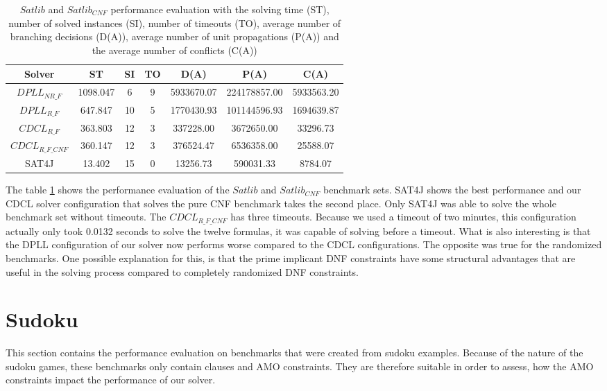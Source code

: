 \begin{table}[htb]
\centering
\caption[$Satlib$ and $Satlib_{CNF}$ performance evaluation]{$Satlib$ and $Satlib_{CNF}$ performance evaluation with the solving time (ST), number of solved instances (SI), number of timeouts (TO), average number of branching decisions (D(A)), average number of unit propagations (P(A)) and the average number of conflicts (C(A))}
\label{tab:satlibSat}
\begin{tabular}{|c|c|c|c|c|c|c|}
\hline
Solver & ST & SI & TO & D(A) & P(A) & C(A)\\ 
\hline
$DPLL_{NR\_F}$ & 1098.047 & 6 & 9 & 5933670.07 & 224178857.00 & 5933563.20 \\ 
\hline
$DPLL_{R\_F}$ & 647.847 & 10 & 5 & 1770430.93 & 101144596.93 & 1694639.87 \\ 
\hline
$CDCL_{R\_F}$ & 363.803 & 12 & 3 & 337228.00 & 3672650.00 & 33296.73 \\ 
\hline
$CDCL_{R\_F\_CNF}$ & 360.147 & 12 & 3 & 376524.47 & 6536358.00 & 25588.07 \\ 
\hline
SAT4J & 13.402 & 15 & 0 & 13256.73 & 590031.33 & 8784.07 \\ 
\hline
\end{tabular}
\end{table}

The table \ref{tab:satlibSat} shows the performance evaluation of the $Satlib$ and $Satlib_{CNF}$ benchmark sets. SAT4J shows the best performance and our CDCL solver configuration that solves the pure CNF benchmark takes the second place. Only SAT4J was able to solve the whole benchmark set without timeouts. The $CDCL_{R\_F\_CNF}$ has three timeouts. Because we used a timeout of two minutes, this configuration actually only took 0.0132 seconds to solve the twelve formulas, it was capable of solving before a timeout. What is also interesting is that the DPLL configuration of our solver now performs worse compared to the CDCL configurations. The opposite was true for the randomized benchmarks. One possible explanation for this, is that the prime implicant DNF constraints have some structural advantages that are useful in the solving process compared to completely randomized DNF constraints.

\section{Sudoku}

This section contains the performance evaluation on benchmarks that were created from sudoku examples. Because of the nature of the sudoku games, these benchmarks only contain clauses and AMO constraints. They are therefore suitable in order to assess, how the AMO constraints impact the performance of our solver.

